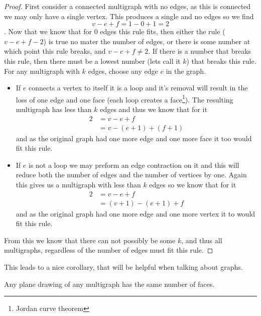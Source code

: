 \documentclass{article}
\begin{document}


\begin{proof}
	First consider a connected multigraph with no edges, as this is connected we may only have a single vertex. This produces a single and no edges so we find $$v-e+f=1-0+1=2$$. Now that we know that for 0 edges this rule fits, then either the rule ($v-e+f-2$) is true no mater the number of edges, or there is some number at which point this rule breaks, and $v-e+f\not=2$. If there is a number that breaks this rule, then there must be a lowest number (lets call it $k$) that breaks this rule. For any multigraph with $k$ edges, choose any edge $e$ in the graph.
	\begin{itemize}
		\item If $e$ connects a vertex to itself it is a loop and it's removal will result in the loss of one edge and one face (each loop creates a face\footnote{Jordan curve theorem}). The resulting multigraph has less than $k$ edges and thus we know that for it \begin{align*}2&=v-e+f \\&= v-(e+1)+(f+1)\end{align*} and as the original graph had one more edge and one more face it too would fit this rule.
		\item If $e$ is not a loop we may preform an edge contraction on it and this will reduce both the number of edges and the number of vertices by one. Again this gives us a multigraph with less than $k$ edges so we know that for it \begin{align*}2&=v-e+f\\&=(v+1)-(e+1)+f\end{align*} and as the original graph had one more edge and one more vertex it to would fit this rule.
	\end{itemize}
	
	From this we know that there can not possibly be some $k$, and thus all multigraphs, regardless of the number of edges must fit this rule.
\end{proof}
This leads to a nice corollary, that will be helpful when talking about graphs.
\begin{corallary}
	Any plane drawing of any multigraph has the same number of faces.
\end{corallary}
\end{document}
